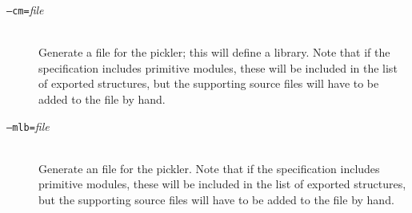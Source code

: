 \begin{description}
  \item[\normalfont\texttt{--cm=}\textit{file}] \mbox{}\\
    Generate a \cm{} file for the pickler; this will define a \cm{} library.
    Note that if the \asdl{} specification includes primitive modules, these
    will be included in the list of exported structures, but the supporting source
    files will have to be added to the \cm{} file by hand.
  \item[\normalfont\texttt{--mlb=}\textit{file}] \mbox{}\\
    Generate an \mlb{} file for the pickler.
    Note that if the \asdl{} specification includes primitive modules, these
    will be included in the list of exported structures, but the supporting source
    files will have to be added to the \mlb{} file by hand.
\end{description}%
